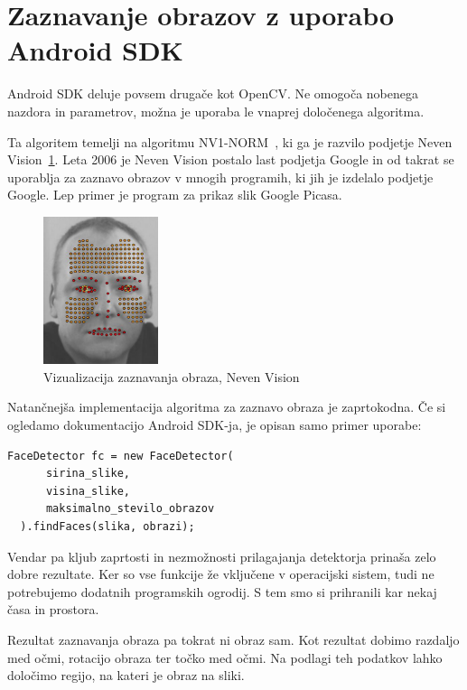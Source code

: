 \documentclass[a4paper, 12pt]{book}
\begin{document}
\section{Zaznavanje obrazov z uporabo Android SDK}
\label{sec:zaznavanjeObrazovAndroidSDK}
Android SDK deluje povsem drugače kot OpenCV. Ne omogoča nobenega nazdora in
parametrov, možna je uporaba le vnaprej določenega algoritma.

Ta algoritem temelji na algoritmu NV1-NORM~\cite{nevenFaceRecognition}, ki ga
je razvilo podjetje Neven Vision~\ref{fig:neven_vision}. Leta 2006 je Neven
Vision postalo last podjetja Google in od takrat se uporablja za zaznavo
obrazov v mnogih programih, ki jih je izdelalo podjetje Google. Lep  primer je
program za prikaz slik Google Picasa.

\begin{figure}[!ht]
    \centering
    \includegraphics[width=0.3\textwidth]{neven_vision}
    \caption{Vizualizacija zaznavanja obraza, Neven Vision}
    \label{fig:neven_vision}
\end{figure}

Natančnejša implementacija algoritma za zaznavo obraza je zaprtokodna. Če si
ogledamo dokumentacijo Android SDK-ja, je opisan samo primer uporabe:
\begin{lstlisting}[style=java, caption=Primer uporabe zaznavanja obraza z orodjem Android SDK]
  FaceDetector fc = new FaceDetector(
      sirina_slike,
      visina_slike,
      maksimalno_stevilo_obrazov
  ).findFaces(slika, obrazi);
\end{lstlisting}

Vendar pa kljub zaprtosti in nezmožnosti prilagajanja detektorja prinaša zelo
dobre rezultate. Ker so vse funkcije že vključene v operacijski sistem, tudi
ne potrebujemo dodatnih programskih ogrodij. S tem smo si prihranili kar nekaj
časa in prostora.

Rezultat zaznavanja obraza pa tokrat ni obraz sam. Kot rezultat dobimo
razdaljo med očmi, rotacijo obraza ter točko med očmi. Na podlagi teh podatkov
lahko določimo regijo, na kateri je obraz na sliki.
\end{document}
